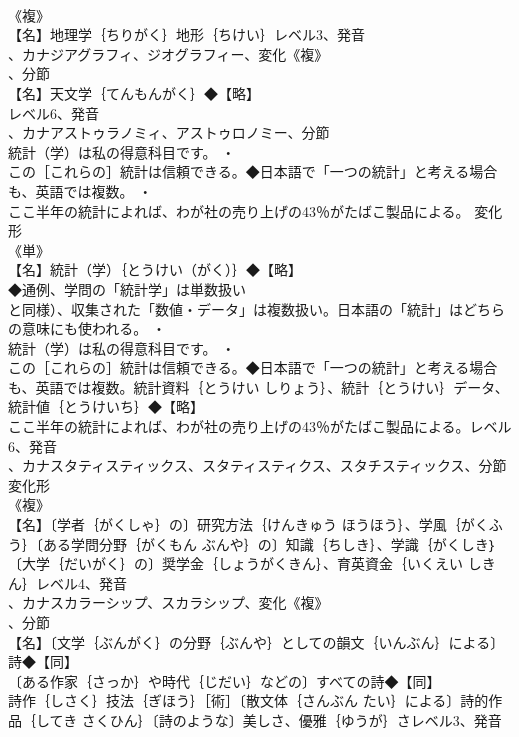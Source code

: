 \documentclass[8pt]{extreport}
\begin{document}
\begin{CJK}{UTF8}{min}
\\	《複》
\\	【名】地理学｛ちりがく｝地形｛ちけい｝レベル3、発音
\\	、カナジアグラフィ、ジオグラフィー、変化《複》
\\	、分節
\\	【名】天文学｛てんもんがく｝◆【略】
\\	レベル6、発音
\\	、カナアストゥラノミィ、アストゥロノミー、分節
\\	統計（学）は私の得意科目です。 ・
\\	この［これらの］統計は信頼できる。◆日本語で「一つの統計」と考える場合も、英語では複数。 ・
\\	ここ半年の統計によれば、わが社の売り上げの43％がたばこ製品による。	変化形 
\\	《単》
\\	【名】統計（学）｛とうけい（がく）｝◆【略】
\\	◆通例、学問の「統計学」は単数扱い
\\	と同様）、収集された「数値・データ」は複数扱い。日本語の「統計」はどちらの意味にも使われる。 ・
\\	統計（学）は私の得意科目です。 ・
\\	この［これらの］統計は信頼できる。◆日本語で「一つの統計」と考える場合も、英語では複数。統計資料｛とうけい しりょう｝、統計｛とうけい｝データ、統計値｛とうけいち｝◆【略】
\\	ここ半年の統計によれば、わが社の売り上げの43％がたばこ製品による。レベル6、発音
\\	、カナスタティスティックス、スタティスティクス、スタチスティックス、分節
\\	変化形 
\\	《複》
\\	【名】〔学者｛がくしゃ｝の〕研究方法｛けんきゅう ほうほう｝、学風｛がくふう｝〔ある学問分野｛がくもん ぶんや｝の〕知識｛ちしき｝、学識｛がくしき｝〔大学｛だいがく｝の〕奨学金｛しょうがくきん｝、育英資金｛いくえい しきん｝レベル4、発音
\\	、カナスカラーシップ、スカラシップ、変化《複》
\\	、分節
\\	【名】〔文学｛ぶんがく｝の分野｛ぶんや｝としての韻文｛いんぶん｝による〕詩◆【同】
\\	〔ある作家｛さっか｝や時代｛じだい｝などの〕すべての詩◆【同】
\\	詩作｛しさく｝技法｛ぎほう｝［術］〔散文体｛さんぶん たい｝による〕詩的作品｛してき さくひん｝〔詩のような〕美しさ、優雅｛ゆうが｝さレベル3、発音

\end{CJK}
\end{document}
